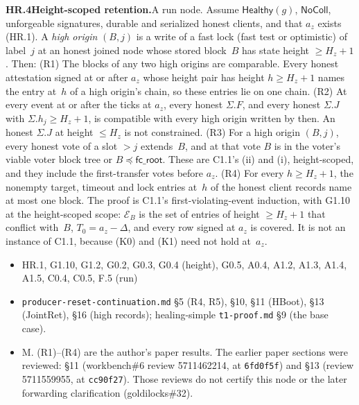 \documentclass{article}
\newcommand{\fcroot}{\mathsf{fc\_root}}
\newcommand{\dagnode}[6]{%
\par\medskip\noindent\textbf{#1\enspace #2.}\enspace #3
\begin{itemize}[leftmargin=2.2em,itemsep=0pt,topsep=2pt]
\item[\emph{Uses}] #4
\item[\emph{Evid.}] #5
\item[\emph{Task}] #6
\end{itemize}}
\begin{document}
\dagnode{HR.4}{Height-scoped retention}{A run node.  Assume
$\mathsf{Healthy}(g)$, $\mathsf{NoColl}$, unforgeable signatures, durable and
serialized honest clients, and that $a_z$ exists (HR.1).  A \emph{high origin}
$(B,j)$ is a write of a fast lock (fast test or optimistic) of label~$j$ at an
honest joined node whose stored block~$B$ has state height $\geq H_z+1$.
Then:
(R1) The blocks of any two high origins are comparable.  Every honest
attestation signed at or after $a_z$ whose height pair has height
$h\geq H_z+1$ names the entry at~$h$ of a high origin's chain, so these
entries lie on one chain.
(R2) At every event at or after the ticks at $a_z$, every honest $\Sigma.F$,
and every honest $\Sigma.J$ with $\Sigma.h_j\geq H_z+1$, is compatible with
every high origin written by then.  An honest $\Sigma.J$ at height
$\leq H_z$ is not constrained.
(R3) For a high origin $(B,j)$, every honest vote of a slot $>j$ extends~$B$,
and at that vote $B$ is in the voter's viable voter block tree or
$B\preceq\fcroot$.  These are C1.1's (ii) and (i), height-scoped, and they
include the first-transfer votes before $a_z$.
(R4) For every $h\geq H_z+1$, the nonempty target, timeout and lock entries
at~$h$ of the honest client records name at most one block.
The proof is C1.1's first-violating-event induction, with G1.10 at the
height-scoped scope: $\mathcal E_B$ is the set of entries of height
$\geq H_z+1$ that conflict with~$B$, $T_0=a_z-\Delta$, and every row signed
at $a_z$ is covered.  It is not an instance of C1.1, because (K0) and (K1)
need not hold at~$a_z$.}
{HR.1, G1.10, G1.2, G0.2, G0.3, G0.4 (height), G0.5, A0.4, A1.2, A1.3, A1.4,
A1.5, C0.4, C0.5, F.5 (run)}
{\texttt{producer-reset-continuation.md} \S5 (R4, R5), \S10, \S11 (HBoot),
\S13 (JointRet), \S16 (high records); healing-simple \texttt{t1-proof.md}
\S9 (the base case).}
{M.  (R1)--(R4) are the author's paper results.  The earlier paper sections
were reviewed: \S11 (workbench\#6 review 5711462214, at \texttt{6fd0f5f}) and
\S13 (review 5711559955, at \texttt{cc90f27}).  Those reviews do not certify
this node or the later forwarding clarification (goldilocks\#32).}
\end{document}
